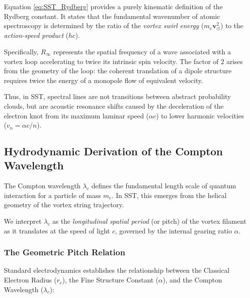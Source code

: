 \documentclass[10pt,reprint,aps,onecolumn,nofootinbib]{revtex4-2}
\begin{document}
            Equation \eqref{eq:SST_Rydberg} provides a purely kinematic definition
            of the Rydberg constant. It states that the fundamental wavenumber of
            atomic spectroscopy is determined by the ratio of the \emph{vortex
    swirl energy} ($m_e \mathbf{v}_{\!\boldsymbol{\circlearrowleft}}^2$) to the \emph{action-speed product} ($hc$).

            Specifically, $R_\infty$ represents the spatial frequency of a wave
            associated with a vortex loop accelerating to twice its intrinsic spin
            velocity. The factor of 2 arises from the geometry of the loop: the
            coherent translation of a dipole structure requires twice the energy
            of a monopole flow of equivalent velocity.

            Thus, in SST, spectral lines are not transitions between abstract
            probability clouds, but are acoustic resonance shifts caused by the
            deceleration of the electron knot from its maximum laminar speed
            ($\alpha c$) to lower harmonic velocities ($v_n = \alpha c / n$).
    \subsection{Hydrodynamic Derivation of the Compton Wavelength}
        \label{sec:SST_compton}

        The Compton wavelength $\lambda_c$ defines the fundamental length scale of
        quantum interaction for a particle of mass $m_e$. In SST, this emerges
        from the helical geometry of the vortex string trajectory.

        We interpret $\lambda_c$ as the \emph{longitudinal spatial period} (or pitch)
        of the vortex filament as it translates at the speed of light $c$,
        governed by the internal gearing ratio $\alpha$.

        \subsubsection*{The Geometric Pitch Relation}

            Standard electrodynamics establishes the relationship between the
            Classical Electron Radius ($r_e$), the Fine Structure Constant ($\alpha$),
            and the Compton Wavelength ($\lambda_c$):
\end{document}
